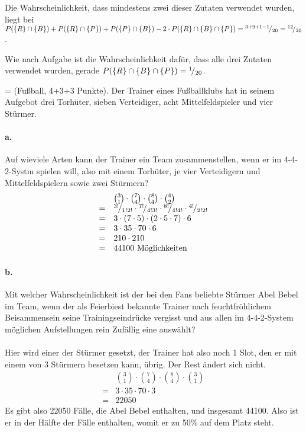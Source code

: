 \documentclass[twoside]{article}
\begin{document}
Die Wahrscheinlichkeit, dass mindestens zwei dieser Zutaten verwendet wurden, liegt bei $P(\{R\} \cap \{B\}) + P(\{R\} \cap \{P\}) + P(\{P\} \cap \{B\}) - 2 \cdot P(\{R\} \cap \{B\} \cap \{P\}) = {}^{3+9+1-1}\!/_{20} = {}^{12}\!/_{20}$.

Wie nach Aufgabe ist die Wahrscheinlichkeit dafür, dass alle drei Zutaten verwendet wurden, gerade $P(\{R\} \cap \{B\} \cap \{P\}) = {}^{1}\!/_{20}$.
\fi



\ifnum\ZettelVier=\True
{}
(Fußball, 4+3+3 Punkte).
Der Trainer eines Fußballklubs hat in seinem Aufgebot drei Torhüter, sieben Verteidiger, acht Mittelfeldspieler und vier Stürmer.
\paragraph{a.}
Auf wieviele Arten kann der Trainer ein Team zusammenstellen, wenn er im 4-4-2-Systm spielen will, also mit einem Torhüter, je vier Verteidigern und Mittelfeldspielern sowie zwei Stürmern?
\[
	\begin{array}{ll}
		 &	\binom{3}{1} \cdot \binom{7}{4} \cdot \binom{8}{4} \cdot \binom{4}{2}	\\
		=&	{}^{3!}\!/_{1!2!} \cdot {}^{7!}\!/_{4!3!} \cdot {}^{8!}\!/_{4!4!} \cdot {}^{4!}\!/_{2!2!}	\\
		=&	3 \cdot (7 \cdot 5) \cdot (2 \cdot 5 \cdot 7) \cdot 6\\
		=&	3 \cdot 35 \cdot 70 \cdot 6\\
		=&	210 \cdot 210\\
		=&	44100\text{ Möglichkeiten}
	\end{array}
\]

\paragraph{b.}
Mit welcher Wahrscheinlichkeit ist der bei den Fans beliebte Stürmer Abel Bebel im Team, wenn der als Feierbiest bekannte Trainer nach feuchtfröhlichem Beisammensein seine Trainingseindrücke vergisst und aus allen im 4-4-2-System möglichen Aufstellungen rein Zufällig eine auswählt?
\\\vspace{.3cm}\\
Hier wird einer der Stürmer gesetzt, der Trainer hat also noch 1 Slot, den er mit einem von 3 Stürmern besetzen kann, übrig.
Der Rest ändert sich nicht.
\[
	\begin{array}{ll}
		 &	\binom{3}{1} \cdot \binom{7}{4} \cdot \binom{8}{4} \cdot \binom{3}{1}	\\
		=&	3 \cdot 35 \cdot 70 \cdot 3\\
		=&	22050
	\end{array}
\]
Es gibt also 22050 Fälle, die Abel Bebel enthalten, und insgesamt 44100.
Also ist er in der Hälfte der Fälle enthalten, womit er zu 50\% auf dem Platz steht.
\end{document}
